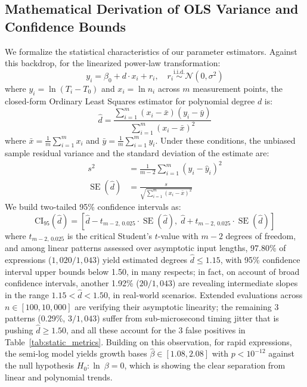 \documentclass{ieeeaccess}
\begin{document}
\subsection{Mathematical Derivation of OLS Variance and Confidence Bounds}
We formalize the statistical characteristics of our parameter estimators. Against this backdrop, for the linearized power-law transformation:
\begin{equation}\label{eq:ols_model_spec}
y_i = \beta_0 + d \cdot x_i + r_i, \quad r_i \overset{\mathrm{i.i.d.}}{\sim} \mathcal{N}(0, \sigma^2)
\end{equation}
where $y_i = \ln(T_i - T_0)$ and $x_i = \ln n_i$ across $m$ measurement points, the closed-form Ordinary Least Squares estimator for polynomial degree $d$ is:
\begin{equation}\label{eq:ols_d_hat}
\hat{d} = \frac{\sum_{i=1}^m (x_i - \bar{x})(y_i - \bar{y})}{\sum_{i=1}^m (x_i - \bar{x})^2}
\end{equation}
where $\bar{x} = \frac{1}{m}\sum_{i=1}^m x_i$ and $\bar{y} = \frac{1}{m}\sum_{i=1}^m y_i$. Under these conditions, the unbiased sample residual variance and the standard deviation of the estimate are:
\begin{align}
s^2 &= \frac{1}{m-2} \sum_{i=1}^m (y_i - \hat{y}_i)^2 \label{eq:ols_s2} \\
\operatorname{SE}(\hat{d}) &= \frac{s}{\sqrt{\sum_{i=1}^m (x_i - \bar{x})^2}} \label{eq:ols_se}
\end{align}
We build two-tailed 95\% confidence intervals as:
\begin{equation}\label{eq:ci_95_d}
\mathrm{CI}_{95}(\hat{d}) = \left[ \hat{d} - t_{m-2, \, 0.025} \cdot \operatorname{SE}(\hat{d}), \; \hat{d} + t_{m-2, \, 0.025} \cdot \operatorname{SE}(\hat{d}) \right]
\end{equation}
where $t_{m-2, \, 0.025}$ is the critical Student's $t$-value with $m-2$ degrees of freedom, and among linear patterns assessed over asymptotic input lengths, 97.80\% of expressions ($1{,}020 / 1{,}043$) yield estimated degrees $\hat{d} \le 1.15$, with 95\% confidence interval upper bounds below 1.50, in many respects; in fact, on account of broad confidence intervals, another 1.92\% ($20 / 1{,}043$) are revealing intermediate slopes in the range $1.15 < \hat{d} < 1.50$, in real-world scenarios. Extended evaluations across $n \in [100, 10{,}000]$ are verifying their asymptotic linearity; the remaining 3 patterns (0.29\%, $3 / 1{,}043$) suffer from sub-microsecond timing jitter that is pushing $\hat{d} \ge 1.50$, and all these account for the 3 false positives in Table~\ref{tab:static_metrics}. Building on this observation, for rapid expressions, the semi-log model yields growth bases $\hat{\beta} \in [1.08, 2.08]$ with $p < 10^{-12}$ against the null hypothesis $H_0: \ln\ \beta = 0$, which is showing the clear separation from linear and polynomial trends.
\end{document}
